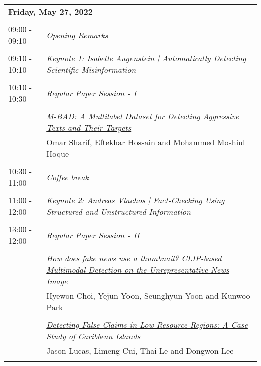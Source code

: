 \documentclass[11pt,oneside]{book}
\begin{document}
        \begin{tabular}{p{24mm}p{124mm}}
    \multicolumn{2}{l}{\bf Friday, May 27, 2022 } \\\\
                09:00 - 09:10 & \emph{Opening Remarks}\\\\
      
                      09:10 - 10:10 & \emph{Keynote 1: Isabelle Augenstein | Automatically Detecting Scientific Misinformation}\\\\
      
                      10:10 - 10:30 & \emph{Regular Paper Session - I}\\\\
      
                
                      & \hyperlink{page.75}{\emph{M-BAD: A Multilabel Dataset for Detecting Aggressive Texts and Their Targets}}\\
        & Omar Sharif, Eftekhar Hossain and Mohammed Moshiul Hoque\\\\
                      10:30 - 11:00 & \emph{Coffee break}\\\\
      
                      11:00 - 12:00 & \emph{Keynote 2: Andreas Vlachos | Fact-Checking Using Structured and Unstructured Information}\\\\
      
                      13:00 - 12:00 & \emph{Regular Paper Session - II}\\\\
      
                
                      & \hyperlink{page.86}{\emph{How does fake news use a thumbnail? CLIP-based Multimodal Detection on the Unrepresentative News Image}}\\
        & Hyewon Choi, Yejun Yoon, Seunghyun Yoon and Kunwoo Park\\\\
                
                      & \hyperlink{page.95}{\emph{Detecting False Claims in Low-Resource Regions: A Case Study of Caribbean Islands}}\\
        & Jason Lucas, Limeng Cui, Thai Le and Dongwon Lee\\\\
                

\end{tabular}
\end{document}
